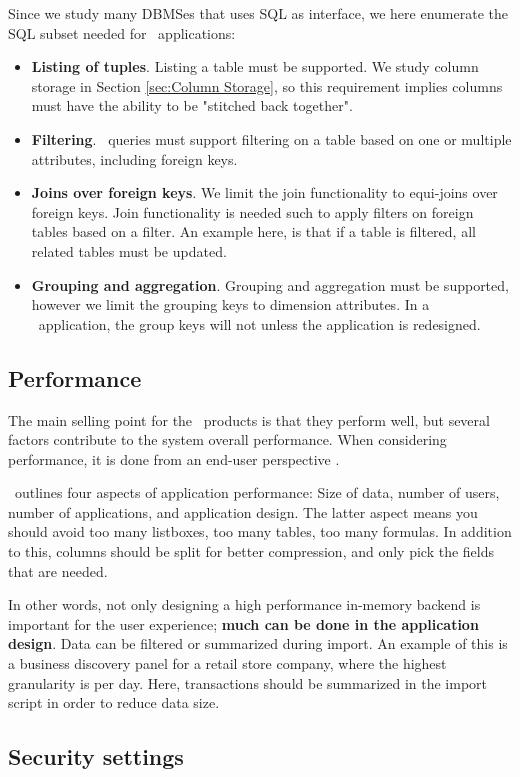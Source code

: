 Since we study many DBMSes that uses SQL as interface, we here enumerate the SQL subset needed for \bd~applications:
\begin{itemize}
  \item \textbf{Listing of tuples}. Listing a table must be supported. We study column storage in Section \ref{sec:Column Storage}, so this requirement implies columns must have the ability to be "stitched back together".
  \item \textbf{Filtering}. \bd~queries must support filtering on a table based on one or multiple attributes, including foreign keys.
  \item \textbf{Joins over foreign keys}. We limit the join functionality to equi-joins over foreign keys. Join functionality is needed such to apply filters on foreign tables based on a filter. An example here, is that if a table is filtered, all related tables must be updated.
  \item \textbf{Grouping and aggregation}. Grouping and aggregation must be supported, however we limit the grouping keys to dimension attributes. In a \bd~application, the group keys will not unless the application is redesigned.
\end{itemize}

\subsection{Performance}
\label{sub:Performance}
The main selling point for the \bd~products is that they perform well, but several factors contribute to the system overall performance. When considering performance, it is done from an end-user perspective \cite{Qlik2011-yc}.

\qlikview~outlines four aspects of application performance: Size of data, number of users, number of applications, and application design. The latter aspect means you should avoid too many listboxes, too many tables, too many formulas. In addition to this, columns should be split for better compression, and only pick the fields that are needed.

In other words, not only designing a high performance in-memory backend is important for the user experience; \textbf{much can be done in the application design}. Data can be filtered or summarized during import. An example of this is a business discovery panel for a retail store company, where the highest granularity is per day. Here, transactions should be summarized in the import script in order to reduce data size.
\subsection{Security settings}
\label{sub:Security settings}

